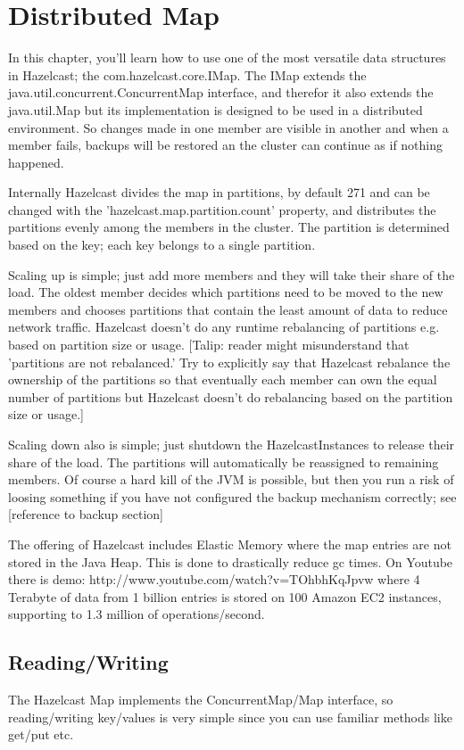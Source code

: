 \chapter{Distributed Map}
In this chapter, you'll learn how to use one of the most versatile data structures in Hazelcast; the com.hazelcast.core.IMap. The IMap extends the java.util.concurrent.ConcurrentMap interface, and therefor it also extends the java.util.Map but its implementation is designed to be used in a distributed environment. So changes made in one member are visible in another and when a member fails, backups will be restored an the cluster can continue as if nothing happened.

Internally Hazelcast divides the map in partitions, by default 271 and can be changed with the 'hazelcast.map.partition.count' property, and distributes the partitions evenly among the members in the cluster. The partition is determined based on the key; each key belongs to a single partition. 

Scaling up is simple; just add more members and they will take their share of the load. The oldest member decides which partitions need to be moved to the new members and chooses partitions that contain the least amount of data to reduce network traffic. Hazelcast doesn't do any runtime rebalancing of partitions e.g. based on partition size or usage. 
[Talip: reader might misunderstand that 'partitions are not rebalanced.' Try to explicitly say that Hazelcast rebalance the ownership of the partitions so that eventually each member can own the equal number of partitions but Hazelcast doesn't do rebalancing based on the partition size or usage.]

Scaling down also is simple; just shutdown the HazelcastInstances to release their share of the load. The partitions will automatically be reassigned to remaining members. Of course a hard kill of the JVM is possible, but then you run a risk of loosing something if you have not configured the backup mechanism correctly; see [reference to backup section]

The offering of Hazelcast includes Elastic Memory where the map entries are not stored in the Java Heap. This is done to drastically reduce gc times. On Youtube there is demo: http://www.youtube.com/watch?v=TOhbhKqJpvw where 4 Terabyte of data from 1 billion entries is stored on 100 Amazon EC2 instances, supporting to 1.3 million of operations/second.

\section{Reading/Writing}
The Hazelcast Map implements the ConcurrentMap/Map interface, so reading/writing key/values is very simple since you can use familiar methods like get/put etc. 

